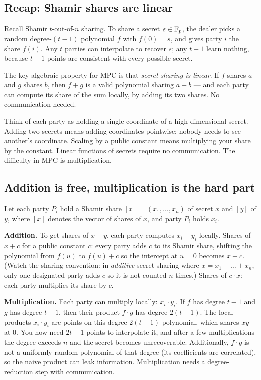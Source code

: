 \subsection{Recap: Shamir shares are linear}

Recall Shamir $t$-out-of-$n$ sharing. To share a secret $s \in \mathbb{F}_p$, the dealer picks a random degree-$(t-1)$ polynomial $f$ with $f(0) = s$, and gives party $i$ the share $f(i)$. Any $t$ parties can interpolate to recover $s$; any $t-1$ learn nothing, because $t-1$ points are consistent with every possible secret.

The key algebraic property for MPC is that \emph{secret sharing is linear}. If $f$ shares $a$ and $g$ shares $b$, then $f + g$ is a valid polynomial sharing $a + b$ --- and each party can compute its share of the sum locally, by adding its two shares. No communication needed.

\begin{intuitionbox}
Think of each party as holding a single coordinate of a high-dimensional secret. Adding two secrets means adding coordinates pointwise; nobody needs to see another's coordinate. Scaling by a public constant means multiplying your share by the constant. Linear functions of secrets require no communication. The difficulty in MPC is multiplication.
\end{intuitionbox}

\subsection{Addition is free, multiplication is the hard part}

Let each party $P_i$ hold a Shamir share $[x] = (x_1, \dots, x_n)$ of secret $x$ and $[y]$ of $y$, where $[x]$ denotes the vector of shares of $x$, and party $P_i$ holds $x_i$.

\textbf{Addition.} To get shares of $x + y$, each party computes $x_i + y_i$ locally. Shares of $x + c$ for a public constant $c$: every party adds $c$ to its Shamir share, shifting the polynomial from $f(u)$ to $f(u) + c$ so the intercept at $u = 0$ becomes $x + c$. (Watch the sharing convention: in \emph{additive} secret sharing where $x = x_1 + \dots + x_n$, only one designated party adds $c$ so it is not counted $n$ times.) Shares of $c \cdot x$: each party multiplies its share by $c$.

\textbf{Multiplication.} Each party can multiply locally: $x_i \cdot y_i$. If $f$ has degree $t-1$ and $g$ has degree $t-1$, then their product $f \cdot g$ has degree $2(t-1)$. The local products $x_i \cdot y_i$ are points on this degree-$2(t-1)$ polynomial, which shares $xy$ at $0$. You now need $2t-1$ points to interpolate it, and after a few multiplications the degree exceeds $n$ and the secret becomes unrecoverable. Additionally, $f \cdot g$ is not a uniformly random polynomial of that degree (its coefficients are correlated), so the naive product can leak information. Multiplication needs a degree-reduction step with communication.

